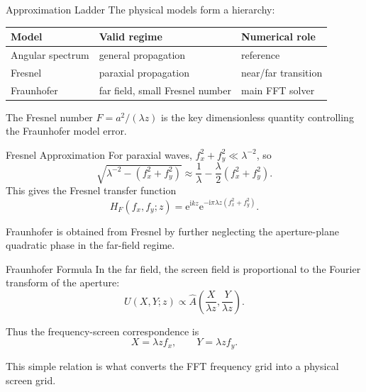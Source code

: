 \documentclass[aspectratio=169,11pt]{beamer}
\begin{document}
\begin{frame}{Approximation Ladder}
    The physical models form a hierarchy:

    \vspace{0.2cm}
    \begin{center}
    \begin{tabular}{lll}
        \toprule
        Model & Valid regime & Numerical role \\
        \midrule
        Angular spectrum & general propagation & reference \\
        Fresnel & paraxial propagation & near/far transition \\
        Fraunhofer & far field, small Fresnel number & main FFT solver \\
        \bottomrule
    \end{tabular}
    \end{center}

    \vspace{0.25cm}
    The Fresnel number \(F=a^2/(\lambda z)\) is the key dimensionless quantity controlling the
    Fraunhofer model error.
\end{frame}

\begin{frame}{Fresnel Approximation}
    For paraxial waves, \(f_x^2+f_y^2\ll \lambda^{-2}\), so
    \[
        \sqrt{\lambda^{-2}-(f_x^2+f_y^2)}
        \approx
        \frac{1}{\lambda}-\frac{\lambda}{2}(f_x^2+f_y^2).
    \]
    This gives the Fresnel transfer function
    \[
        H_F(f_x,f_y;z)
        =
        \mathrm{e}^{\mathrm{i}kz}
        \mathrm{e}^{-\mathrm{i}\pi\lambda z(f_x^2+f_y^2)}.
    \]

    \vspace{0.15cm}
    Fraunhofer is obtained from Fresnel by further neglecting the aperture-plane quadratic phase in the
    far-field regime.
\end{frame}

\begin{frame}{Fraunhofer Formula}
    In the far field, the screen field is proportional to the Fourier transform of the aperture:
    \[
        U(X,Y;z)
        \propto
        \hat{A}\!\left(\frac{X}{\lambda z},\frac{Y}{\lambda z}\right).
    \]

    \vspace{0.2cm}
    Thus the frequency-screen correspondence is
    \[
        X=\lambda z f_x,\qquad Y=\lambda z f_y.
    \]

    \vspace{0.2cm}
    This simple relation is what converts the FFT frequency grid into a physical screen grid.
\end{frame}
\end{document}
